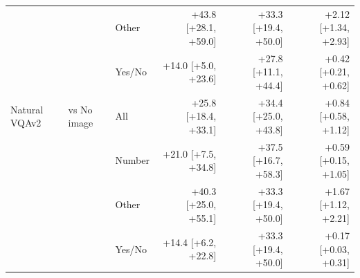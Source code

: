 \begin{table}[t]
\begin{tabular}{lllrrr}
 &  & Other & +43.8 [+28.1, +59.0] & +33.3 [+19.4, +50.0] & +2.12 [+1.34, +2.93] \\
 &  & Yes/No & +14.0 [+5.0, +23.6] & +27.8 [+11.1, +44.4] & +0.42 [+0.21, +0.62] \\
Natural VQAv2 & vs No image & All & +25.8 [+18.4, +33.1] & +34.4 [+25.0, +43.8] & +0.84 [+0.58, +1.12] \\
 &  & Number & +21.0 [+7.5, +34.8] & +37.5 [+16.7, +58.3] & +0.59 [+0.15, +1.05] \\
 &  & Other & +40.3 [+25.0, +55.1] & +33.3 [+19.4, +50.0] & +1.67 [+1.12, +2.21] \\
 &  & Yes/No & +14.4 [+6.2, +22.8] & +33.3 [+19.4, +50.0] & +0.17 [+0.03, +0.31] \\
\bottomrule
\end{tabular}
\end{table}
